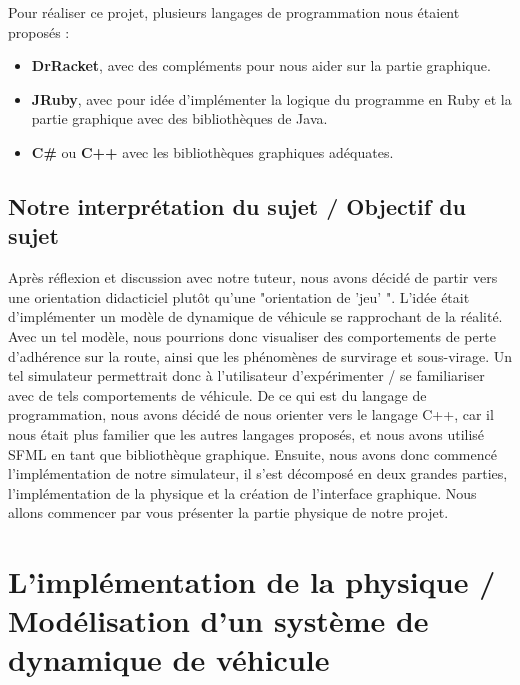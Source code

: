 \documentclass[a4paper,12pt]{report}
\begin{document}
    Pour réaliser ce projet, plusieurs langages de programmation nous étaient proposés :
    \begin{itemize}
        \item \textbf{DrRacket}, avec des compléments pour nous aider sur la partie graphique.
        \item \textbf{JRuby}, avec pour idée d'implémenter la logique du programme en Ruby et la partie graphique avec des bibliothèques de Java.
        \item \textbf{C\#} ou \textbf{C++} avec les bibliothèques graphiques adéquates.
    \end{itemize}


    \subsection{Notre interprétation du sujet / Objectif du sujet }
    Après réflexion et discussion avec notre tuteur, nous avons décidé de partir vers une orientation didacticiel plutôt qu'une "orientation de 'jeu' ". L'idée était d'implémenter un modèle de dynamique de véhicule se rapprochant de la réalité. Avec un tel modèle, nous pourrions donc visualiser des comportements de perte d'adhérence sur la route, ainsi que les phénomènes de survirage et sous-virage. Un tel simulateur permettrait donc à l'utilisateur d'expérimenter / se familiariser avec de tels comportements de véhicule. De ce qui est du langage de programmation, nous avons décidé de nous orienter vers le langage C++, car il nous était plus familier que les autres langages proposés, et nous avons utilisé SFML en tant que bibliothèque graphique.
    Ensuite, nous avons donc commencé l'implémentation de notre simulateur, il s'est décomposé en deux grandes parties, l'implémentation de la physique et la création de l'interface graphique. Nous allons commencer par vous présenter la partie physique de notre projet.

    \newpage

    \section{L'implémentation de la physique / Modélisation d'un système de dynamique de véhicule}
\end{document}
